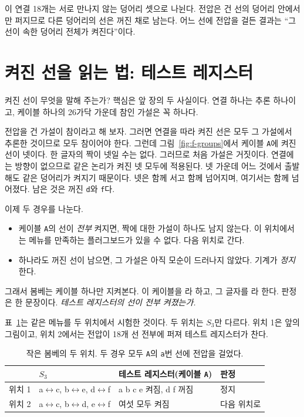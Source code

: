 이 연결 18개는 서로 만나지 않는 덩어리 셋으로 나뉜다. 전압은 건 선의 덩어리 안에서만 퍼지므로 다른 덩어리의
선은 꺼진 채로 남는다. 어느 선에 전압을 걸든 결과는 ``그 선이 속한 덩어리 전체가 켜진다''이다.

\section{켜진 선을 읽는 법: 테스트 레지스터}\label{sec:f-register}

켜진 선이 무엇을 말해 주는가? 핵심은 앞 장의 두 사실이다. 연결 하나는 추론 하나이고, 케이블 하나의 26가닥
가운데 참인 가설은 꼭 하나다.

\Why 전압을 건 가설이 참이라고 해 보자. 그러면 연결을 따라 켜진 선은 모두 그 가설에서 추론한 것이므로 모두
참이어야 한다. 그런데 그림~\ref{fig:f-groups}에서 케이블 \texttt{A}에 켜진 선이 넷이다. 한 글자의 짝이 넷일 수는
없다. 그러므로 처음 가설은 거짓이다. 연결에는 방향이 없으므로 같은 논리가 켜진 넷 모두에 적용된다. 넷 가운데
어느 것에서 출발해도 같은 덩어리가 켜지기 때문이다. 넷은 함께 서고 함께 넘어지며, 여기서는 함께 넘어졌다.
남은 것은 꺼진 \texttt{d}와 \texttt{f}다.

이제 두 경우를 나눈다.

\begin{itemize}
\item 케이블 \texttt{A}의 선이 \emph{전부} 켜지면, 짝에 대한 가설이 하나도 남지 않는다. 이 위치에서는 메뉴를 만족하는
플러그보드가 있을 수 없다. 다음 위치로 간다.
\item 하나라도 꺼진 선이 남으면, 그 가설은 아직 모순이 드러나지 않았다. 기계가 \emph{정지}한다.
\end{itemize}

그래서 봄베는 케이블 하나만 지켜본다. 이 케이블을 라 하고, 그 글자를
라 한다. 판정은 한 문장이다. \emph{테스트 레지스터의 선이 전부 켜졌는가.}

표~\ref{tab:f-two}는 같은 메뉴를 두 위치에서 시험한 것이다. 두 위치는 $S_3$만 다르다. 위치 1은 앞의 그림이고,
위치 2에서는 전압이 18개 선 전부에 퍼져 테스트 레지스터가 찬다.

\begin{table}[ht]
\centering
\caption{작은 봄베의 두 위치. 두 경우 모두 \texttt{A}의 \texttt{a}번 선에 전압을 걸었다.}
\label{tab:f-two}
\small
\begin{tabular}{l l l l}
\toprule
& $S_3$ & 테스트 레지스터(케이블 \texttt{A}) & 판정 \\
\midrule
위치 1 & a$\leftrightarrow$c, b$\leftrightarrow$e, d$\leftrightarrow$f & a b c e 켜짐, d f 꺼짐 & 정지 \\
위치 2 & a$\leftrightarrow$c, b$\leftrightarrow$d, e$\leftrightarrow$f & 여섯 모두 켜짐 & 다음 위치로 \\
\bottomrule
\end{tabular}
\end{table}

